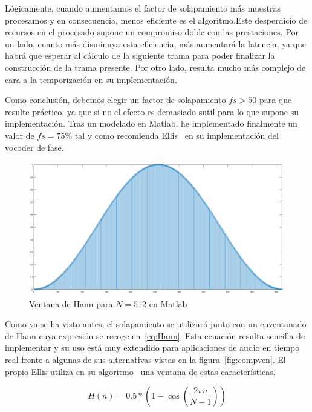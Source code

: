Lógicamente, cuando aumentamos el factor de solapamiento más muestras procesamos y en consecuencia, menos eficiente es el algoritmo.Este desperdicio de recursos en el procesado supone un compromiso doble con las prestaciones. Por un lado, cuanto más disminuya esta eficiencia, más aumentará la latencia, ya que habrá que esperar al cálculo de la siguiente trama para poder finalizar la construcción de la trama presente. Por otro lado, resulta mucho más complejo de cara a la temporización en su implementación. 

Como conclusión, debemos elegir un factor de solapamiento $fs > 50$ para que resulte práctico, ya que si no el efecto es demasiado sutil para lo que supone su implementación. Tras un modelado en Matlab, he implementado finalmente un valor de $fs = 75\%$ tal y como recomienda Ellis~\cite{Ellis} en su implementación del vocoder de fase.

\begin{figure}[!b]
\begin{center}
\includegraphics[width=15cm]{img/ventana_utilizada.png}
\caption{\label{fig:used_win}Ventana de Hann para $N = 512$ en Matlab}
\end{center}
\end{figure}

Como ya se ha visto antes, el solapamiento se utilizará junto con un enventanado de Hann cuya expresión se recoge en~\ref{eq:Hann}. Esta ecuación resulta sencilla de implementar y su uso está muy extendido para aplicaciones de audio en tiempo real frente a algunas de sus alternativas vistas en la figura~\ref{fig:compven}. El propio Ellis utiliza en su algoritmo~\cite{Ellis} una ventana de estas características.

\begin{equation}
\label{eq:Hann}
 H(n) = 0.5 * \left(1 - \cos\left(\frac{2\pi n}{N - 1}\right)\right)
 \end{equation} 
 
